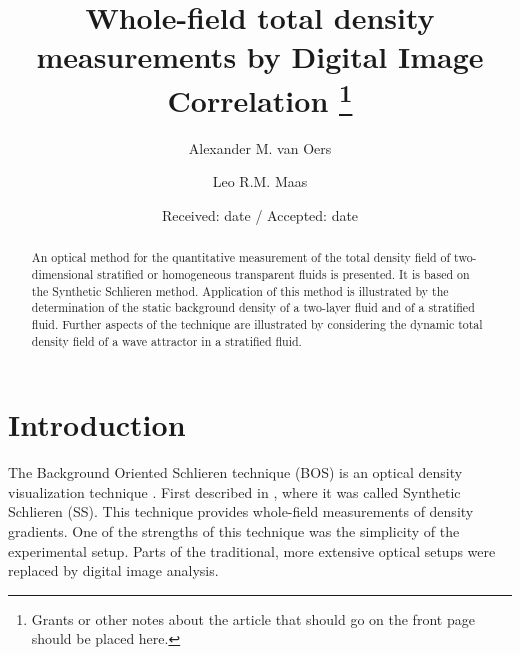 \documentclass[draft]{svjour3}                     %
\begin{document}
\title{Whole-field total density measurements by Digital Image Correlation
\thanks{Grants or other notes
about the article that should go on the front page should be
placed here. }
}




\author{Alexander M. van Oers \and
       Leo R.M. Maas %
}



\date{Received: date / Accepted: date}


\maketitle

\begin{abstract}
An optical method for the quantitative measurement of the total density field of two-dimensional stratified or homogeneous transparent fluids is presented. It is based on the Synthetic Schlieren method. Application of this method is illustrated by the determination of the static background density of a two-layer fluid and of a stratified fluid. Further aspects of the technique are illustrated by considering the dynamic total density field of a wave attractor in a stratified fluid.
\end{abstract}

\section{Introduction}
\label{intro}
The Background Oriented Schlieren technique (BOS) is an optical density visualization technique \cite{meier2002computerized,raffel2015background}. First described in \cite{dalziel2000whole}, where it was called Synthetic Schlieren (SS). This technique provides whole-field measurements of density gradients. One of the strengths of this technique was the simplicity of the experimental setup. Parts of the traditional, more extensive optical setups were replaced by digital image analysis. 
\end{document}
